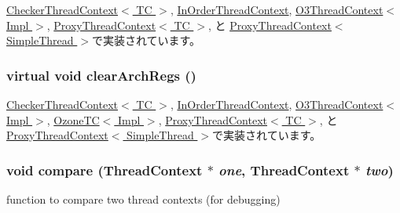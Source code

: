 \hyperlink{classCheckerThreadContext_ab542a5cf9ce4b41042d61e42dfe3aeab}{CheckerThreadContext$<$ TC $>$}, \hyperlink{classInOrderThreadContext_ab542a5cf9ce4b41042d61e42dfe3aeab}{InOrderThreadContext}, \hyperlink{classO3ThreadContext_ab542a5cf9ce4b41042d61e42dfe3aeab}{O3ThreadContext$<$ Impl $>$}, \hyperlink{classProxyThreadContext_ab542a5cf9ce4b41042d61e42dfe3aeab}{ProxyThreadContext$<$ TC $>$}, と \hyperlink{classProxyThreadContext_ab542a5cf9ce4b41042d61e42dfe3aeab}{ProxyThreadContext$<$ SimpleThread $>$}で実装されています。\hypertarget{classThreadContext_ae0375c0a094eeb6fe8f73db4393d4ceb}{
\subsubsection[{clearArchRegs}]{\setlength{\rightskip}{0pt plus 5cm}virtual void clearArchRegs ()}}
\label{classThreadContext_ae0375c0a094eeb6fe8f73db4393d4ceb}


\hyperlink{classCheckerThreadContext_ad5c88ea41846742bd8c70d9c50f31945}{CheckerThreadContext$<$ TC $>$}, \hyperlink{classInOrderThreadContext_ad5c88ea41846742bd8c70d9c50f31945}{InOrderThreadContext}, \hyperlink{classO3ThreadContext_ad5c88ea41846742bd8c70d9c50f31945}{O3ThreadContext$<$ Impl $>$}, \hyperlink{classOzoneCPU_1_1OzoneTC_ad5c88ea41846742bd8c70d9c50f31945}{OzoneTC$<$ Impl $>$}, \hyperlink{classProxyThreadContext_ad5c88ea41846742bd8c70d9c50f31945}{ProxyThreadContext$<$ TC $>$}, と \hyperlink{classProxyThreadContext_ad5c88ea41846742bd8c70d9c50f31945}{ProxyThreadContext$<$ SimpleThread $>$}で実装されています。\hypertarget{classThreadContext_a504f3701af193f6d1c7f59d43696fca6}{
\subsubsection[{compare}]{\setlength{\rightskip}{0pt plus 5cm}void compare ({\bf ThreadContext} $\ast$ {\em one}, \/  {\bf ThreadContext} $\ast$ {\em two})}}
\label{classThreadContext_a504f3701af193f6d1c7f59d43696fca6}
function to compare two thread contexts (for debugging) 


